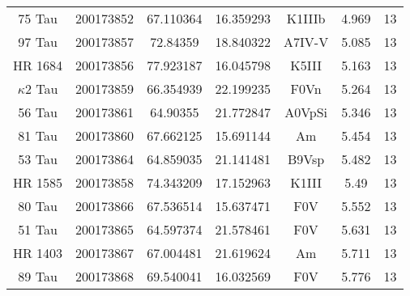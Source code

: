 \begin{table*}
\begin{tabular}{ccccccc}
75 Tau & 200173852 & 67.110364 & 16.359293 & K1IIIb & 4.969 & 13 \\
97 Tau & 200173857 & 72.84359 & 18.840322 & A7IV-V & 5.085 & 13 \\
HR 1684 & 200173856 & 77.923187 & 16.045798 & K5III & 5.163 & 13 \\
$\kappa$2 Tau & 200173859 & 66.354939 & 22.199235 & F0Vn & 5.264 & 13 \\
56 Tau & 200173861 & 64.90355 & 21.772847 & A0VpSi & 5.346 & 13 \\
81 Tau & 200173860 & 67.662125 & 15.691144 & Am & 5.454 & 13 \\
53 Tau & 200173864 & 64.859035 & 21.141481 & B9Vsp & 5.482 & 13 \\
HR 1585 & 200173858 & 74.343209 & 17.152963 & K1III & 5.49 & 13 \\
80 Tau & 200173866 & 67.536514 & 15.637471 & F0V & 5.552 & 13 \\
51 Tau & 200173865 & 64.597374 & 21.578461 & F0V & 5.631 & 13 \\
HR 1403 & 200173867 & 67.004481 & 21.619624 & Am & 5.711 & 13 \\
89 Tau & 200173868 & 69.540041 & 16.032569 & F0V & 5.776 & 13 \\
\hline
\end{tabular}
\end{table*}
